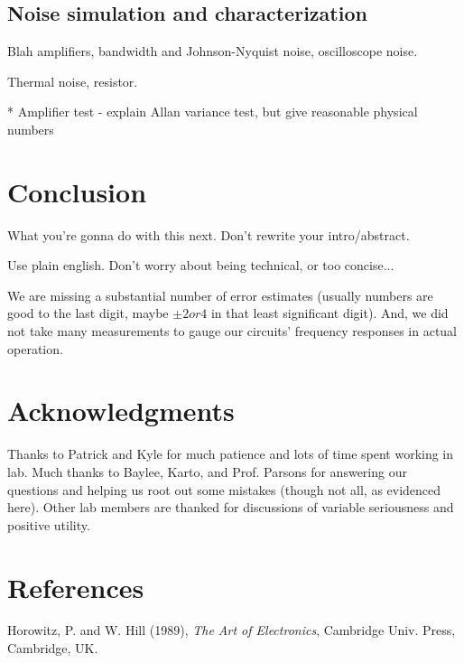 \documentclass[11pt]{article}
\begin{document}
\subsection{Noise simulation and characterization}
Blah amplifiers, bandwidth and Johnson-Nyquist noise, oscilloscope noise.

Thermal noise, resistor.


* Amplifier test - explain Allan variance test, but give reasonable physical numbers

\section{Conclusion}

What you're gonna do with this next.  Don't rewrite your intro/abstract.

Use plain english.  Don't worry about being technical, or too concise...

We are missing a substantial number of error estimates (usually numbers are
good to the last digit, maybe $\pm 2 or 4$ in that least significant digit).
And, we did not take many measurements to gauge our circuits' frequency
responses in actual operation.

\section{Acknowledgments}

Thanks to Patrick and Kyle for much patience and lots of time spent working in
lab.  Much thanks to Baylee, Karto, and Prof. Parsons for answering our
questions and helping us root out some mistakes (though not all, as evidenced
here).  Other lab members are thanked for discussions of variable seriousness
and positive utility.

\section{References}

\hangindent 0.25in Horowitz, P. and W. Hill (1989), \emph{The Art of
Electronics}, Cambridge Univ. Press, Cambridge, UK.
\end{document}
